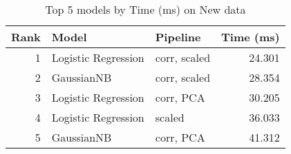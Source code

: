 \begin{table}[!htb]
\caption{Top 5 models by Time (ms) on New data}
\label{table-top-5-time-(ms)-new}
\centering
\begin{tabular}{rllr}
\toprule
Rank & Model & Pipeline & Time (ms) \\
\midrule
1 & Logistic Regression & corr, scaled & 24.301 \\
2 & GaussianNB & corr, scaled & 28.354 \\
3 & Logistic Regression & corr, PCA & 30.205 \\
4 & Logistic Regression & scaled & 36.033 \\
5 & GaussianNB & corr, PCA & 41.312 \\
\bottomrule
\end{tabular}
\end{table}
